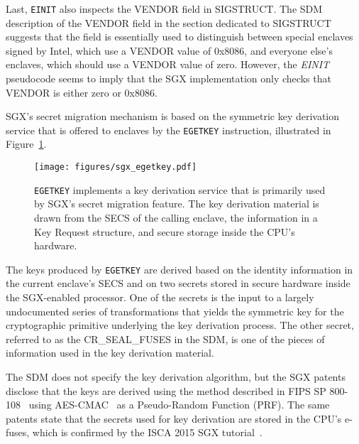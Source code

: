 Last, \texttt{EINIT} also inspects the VENDOR field in SIGSTRUCT. The SDM
description of the VENDOR field in the section dedicated to SIGSTRUCT suggests
that the field is essentially used to distinguish between special enclaves
signed by Intel, which use a VENDOR value of 0x8086, and everyone else's
enclaves, which should use a VENDOR value of zero. However, the \textit{EINIT}
pseudocode seems to imply that the SGX implementation only checks that
VENDOR is either zero or 0x8086.


\label{sec:sgx_egetkey}

SGX's secret migration mechanism is based on the symmetric key derivation
service that is offered to enclaves by the \texttt{EGETKEY} instruction,
illustrated in Figure~\ref{fig:sgx_egetkey}.

\begin{figure}[hbt]
  \centering
  \texttt{[image: figures/sgx\_egetkey.pdf]}
  \caption{
    \texttt{EGETKEY} implements a key derivation service that is primarily used
    by SGX's secret migration feature. The key derivation material is drawn
    from the SECS of the calling enclave, the information in a Key Request
    structure, and secure storage inside the CPU's hardware.
  }
  \label{fig:sgx_egetkey}
\end{figure}

The keys produced by \texttt{EGETKEY} are derived based on the identity
information in the current enclave's SECS and on two secrets stored in secure
hardware inside the SGX-enabled processor. One of the secrets is the input to
a largely undocumented series of transformations that yields the symmetric key
for the cryptographic primitive underlying the key derivation process. The
other secret, referred to as the CR\_SEAL\_FUSES in the SDM, is one of the
pieces of information used in the key derivation material.


The SDM does not specify the key derivation algorithm, but the SGX
patents~\cite{intel2013patent1, intel2013patent2} disclose that the keys are
derived using the method described in FIPS SP 800-108~\cite{fips2009kdf} using
AES-CMAC~\cite{fips2005cmac} as a Pseudo-Random Function (PRF). The same
patents state that the secrets used for key derivation are stored in the CPU's
e-fuses, which is confirmed by the ISCA 2015 SGX
tutorial~\cite{intel2015iscasgx}.

